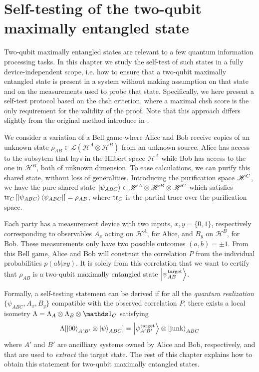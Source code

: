 \chapter{Self-testing of the two-qubit maximally entangled state}

Two-qubit maximally entangled states are relevant to a few quantum information processing tasks.
In this chapter we study the self-test of such states in a fully device-independent scope, i.e. how to ensure that a two-qubit maximally entangled state is present in a system without making assumption on that state and on the measurements used to probe that state.
Specifically, we here present a self-test protocol based on the \acrshort{chsh} criterion, where a maximal \acrshort{chsh} score is the only requirement for the validity of the proof. Note that this approach differs slightly from the original method introduce in \cite{Mayers2004}.

\medbreak 

We consider a variation of a Bell game where Alice and Bob receive copies of an unknown state $\rho_{AB} \in \mathcal{L}(\mathscr{H}^A \otimes \mathscr{H}^B)$ from an unknown source.
Alice has access to the subsytem that lays in the Hilbert space $\mathscr{H}^A$ while Bob has access to the one in $\mathscr{H}^B$, both of unknown dimension.
To ease calculations, we can purify this shared state, without loss of generalities. 
Introducing the purification space $\mathscr{H}^C$, we have the pure shared state $\ket{\psi_{ABC}}\in \mathscr{H}^A \otimes \mathscr{H}^B \otimes \mathscr{H}^C$ which satisfies $\tr_C \left[\ket{\psi_{ABC}}\bra{\psi_{ABC}}\right] = \rho_{AB}$, where $\tr_C$ is the partial trace over the purification space.

Each party has a measurement device with two inputs, $x,y=\{0,1\}$, respectively corresponding to observables $A_x$ acting on $\mathscr{H}^A$, for Alice, and $B_y$ on $\mathscr{H}^B$, for Bob.
These measurements only have two possible outcomes $(a,b)=\pm1$.
From this Bell game, Alice and Bob will construct the correlation $P$ from the individual probabilities $p(ab|xy)$. 
It is solely from this correlation that we want to certify that $\rho_{AB}$ is a two-qubit maximally entangled state $\ket{\psi^{\text{target}}_{AB}}$.

Formally, a self-testing statement can be derived if for all the \textit{quantum realization} $\{\psi_{ABC},A_x,B_y\}$ compatible with the observed correlation $P$, there exists a local isometry $\Lambda = \Lambda_A \otimes \Lambda_B \otimes \id_C$ satisfying
\begin{equation}
	\Lambda [ \ket{00}_{A'B'} \otimes \ket{\psi}_{ABC}] = \ket{\psi^\text{target}_{A'B'}} \otimes \ket{\text{junk}}_{ABC}
	\label{eq:self-testing_statement}
\end{equation}
where $A'$ and $B'$ are ancilliary systems owned by Alice and Bob, respectively, and that are used to \textit{extract} the target state.
The rest of this chapter explains how to obtain this statement for two-qubit maximally entangled states.

